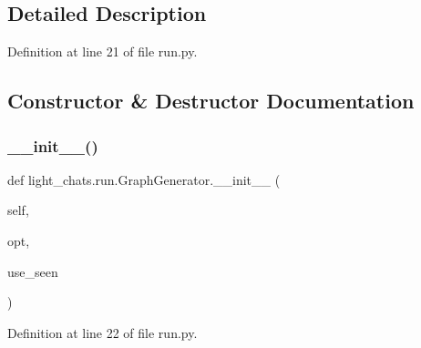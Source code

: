 \subsection{Detailed Description}


Definition at line 21 of file run.\+py.



\subsection{Constructor \& Destructor Documentation}
\mbox{\label{classlight__chats_1_1run_1_1GraphGenerator_aac2b7559d6b74c923297239c810ed53f}} 
\subsubsection{\texorpdfstring{\+\_\+\+\_\+init\+\_\+\+\_\+()}{\_\_init\_\_()}}
{\footnotesize\ttfamily def light\+\_\+chats.\+run.\+Graph\+Generator.\+\_\+\+\_\+init\+\_\+\+\_\+ (\begin{DoxyParamCaption}\item[{}]{self,  }\item[{}]{opt,  }\item[{}]{use\+\_\+seen }\end{DoxyParamCaption})}



Definition at line 22 of file run.\+py.


